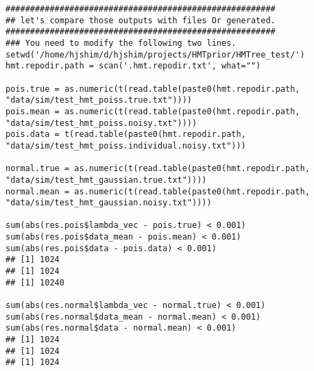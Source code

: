 \documentclass[11pt]{article}
\begin{document}
\begin{lstlisting}
#######################################################
## let's compare those outputs with files Or generated.
#######################################################
### You need to modify the following two lines.
setwd('/home/hjshim/d/hjshim/projects/HMTprior/HMTree_test/')
hmt.repodir.path = scan('.hmt.repodir.txt', what="")

pois.true = as.numeric(t(read.table(paste0(hmt.repodir.path, "data/sim/test_hmt_poiss.true.txt"))))
pois.mean = as.numeric(t(read.table(paste0(hmt.repodir.path, "data/sim/test_hmt_poiss.noisy.txt"))))
pois.data = t(read.table(paste0(hmt.repodir.path, "data/sim/test_hmt_poiss.individual.noisy.txt")))

normal.true = as.numeric(t(read.table(paste0(hmt.repodir.path, "data/sim/test_hmt_gaussian.true.txt"))))
normal.mean = as.numeric(t(read.table(paste0(hmt.repodir.path, "data/sim/test_hmt_gaussian.noisy.txt"))))

sum(abs(res.pois$lambda_vec - pois.true) < 0.001)
sum(abs(res.pois$data_mean - pois.mean) < 0.001)
sum(abs(res.pois$data - pois.data) < 0.001)
## [1] 1024
## [1] 1024
## [1] 10240

sum(abs(res.normal$lambda_vec - normal.true) < 0.001)
sum(abs(res.normal$data_mean - normal.mean) < 0.001)
sum(abs(res.normal$data - normal.mean) < 0.001)
## [1] 1024
## [1] 1024
## [1] 1024
\end{lstlisting}
\end{document}
